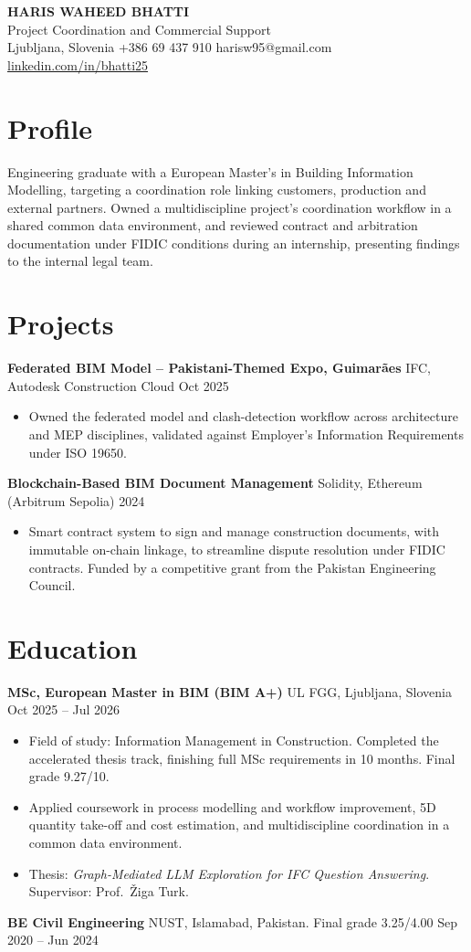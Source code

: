 \documentclass[a4paper,10.5pt]{article}
\newcommand{\datefill}{\dotfill}
\newcommand{\entry}[3]{\vspace{2.5pt}\noindent\textbf{#1} \textbar{} #2 \datefill{} #3\par\vspace{0.5pt}}
\newcommand{\ROLELINE}{Project Coordination and Commercial Support}
\newcommand{\projGuimaraes}{%
\entry{Federated BIM Model -- Pakistani-Themed Expo, Guimar\~aes}{IFC, Autodesk Construction Cloud}{Oct 2025}
\begin{itemize}
  \item Owned the federated model and clash-detection workflow across architecture
        and MEP disciplines, validated against Employer's Information Requirements
        under ISO 19650.
\end{itemize}}
\newcommand{\projBlockchain}{%
\entry{Blockchain-Based BIM Document Management}{Solidity, Ethereum (Arbitrum Sepolia)}{2024}
\begin{itemize}
  \item Smart contract system to sign and manage construction documents, with
        immutable on-chain linkage, to streamline dispute resolution under FIDIC
        contracts. Funded by a competitive grant from the
        Pakistan Engineering Council.
\end{itemize}}
\begin{document}
\begin{center}
  {\LARGE\bfseries HARIS WAHEED BHATTI}\\[2pt]
  {\large \ROLELINE}\\[3pt]
  Ljubljana, Slovenia \textbar{} +386 69 437 910 \textbar{} harisw95@gmail.com\\
  \href{https://linkedin.com/in/bhatti25}{linkedin.com/in/bhatti25}
\end{center}
\vspace{-4pt}

\section{Profile}

\noindent Engineering graduate with a European Master's in Building Information
Modelling, targeting a coordination role linking customers, production and external
partners. Owned a multidiscipline project's coordination workflow in a shared common
data environment, and reviewed contract and arbitration documentation under FIDIC
conditions during an internship, presenting findings to the internal legal team.

\section{Projects}

 \projGuimaraes \projBlockchain

\section{Education}
\entry{MSc, European Master in BIM (BIM A+)}{UL FGG, Ljubljana, Slovenia}{Oct 2025 -- Jul 2026}
\begin{itemize}
  \item Field of study: Information Management in Construction. Completed the
        accelerated thesis track, finishing full MSc requirements in 10 months.
        Final grade 9.27/10.
  \item Applied coursework in process modelling and workflow improvement, 5D
        quantity take-off and cost estimation, and multidiscipline coordination in a
        common data environment.
  \item Thesis: \textit{Graph-Mediated LLM Exploration for IFC Question Answering}.
        Supervisor: Prof.~\v{Z}iga Turk.
\end{itemize}

\entry{BE Civil Engineering}{NUST, Islamabad, Pakistan. Final grade 3.25/4.00}{Sep 2020 -- Jun 2024}
\end{document}
